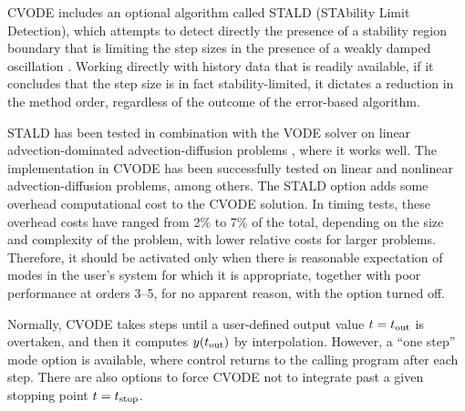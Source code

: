 CVODE includes an optional algorithm called STALD (STAbility Limit
Detection), which attempts to detect directly the presence of a
stability region boundary that is limiting the step sizes in the
presence of a weakly damped oscillation \cite{Hin:92}.  Working
directly with history data that is readily available, if it concludes
that the step size is in fact stability-limited, it dictates a
reduction in the method order, regardless of the outcome of the
error-based algorithm.

STALD has been tested in combination with the VODE solver on linear
advection-dominated advection-diffusion problems \cite{Hin:95}, where
it works well.  The implementation in CVODE has been successfully
tested on linear and nonlinear advection-diffusion problems, among others.
The STALD option adds some overhead computational cost to the CVODE
solution.  In timing tests, these overhead costs have ranged from 2\%
to 7\% of the total, depending on the size and complexity of the
problem, with lower relative costs for larger problems.  Therefore, it
should be activated only when there is reasonable expectation of modes
in the user's system for which it is appropriate, together with poor
performance at orders 3--5, for no apparent reason, with the option
turned off.

Normally, CVODE takes steps until a user-defined output value 
$t = t_{\mbox{\scriptsize out}}$ is overtaken, and then it computes
$y(t_{\mbox{\scriptsize out}})$ by interpolation.  However, a
``one step'' mode option is available, where control returns to the
calling program after each step.  There are also options to force
CVODE not to integrate past a given stopping point 
$t = t_{\mbox{\scriptsize stop}}$.
